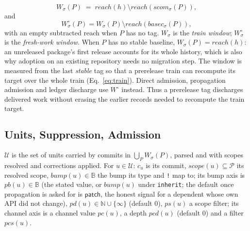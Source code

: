 \documentclass[sigconf,nonacm]{acmart}
\newcommand{\code}[1]{\texttt{#1}}
\begin{document}
\begin{definition}
\label{def:window}
\begin{equation}
  W_\sigma(P) \;=\; \mathit{reach}(h) \setminus
                    \mathit{reach}(\mathit{scom}_\sigma(P)),
  \label{eq:window}
\end{equation}
and
\begin{equation}
  W^\circ_\sigma(P) = W_\sigma(P) \setminus
                       \mathit{reach}(\mathit{basec}_\sigma(P)),
  \label{eq:fresh}
\end{equation}
with an empty subtracted reach when $P$ has no tag.  $W_\sigma$ is the
\emph{train window}; $W^\circ_\sigma$ is the \emph{fresh-work window}.
When $P$ has no stable baseline, $W_\sigma(P) = \mathit{reach}(h)$:
an unreleased package's first release accounts for its whole
history, which is also why adoption on an existing repository needs no
migration step. The window is measured from the last \emph{stable} tag
so that a prerelease train can recompute its target over the whole train
(Eq.~\ref{eq:train}). Direct admission, propagation admission and ledger
discharge use $W^\circ$ instead. Thus a prerelease tag discharges delivered
work without erasing the earlier records needed to recompute the train target.
\end{definition}

\subsection{Units, Suppression, Admission}

\begin{definition}[units]
$\mathcal{U}$ is the set of units carried by commits in
$\bigcup_P W_\sigma(P)$, parsed and with scopes resolved and corrections
applied. For $u \in \mathcal{U}$: $c_u$ is its commit,
$\mathit{scope}(u) \subseteq \mathcal{P}$ its resolved scope,
$\mathit{bump}(u) \in \mathbb{B}$ the bump its type and \code{!} map to;
its bump axis is $\mathit{pb}(u) \in \mathbb{B}$ (the stated value, or
$\mathit{bump}(u)$ under \code{inherit}; the default once propagation is
asked for is $\mathsf{patch}$, the honest signal for a dependent whose
own API did not change), $\mathit{pd}(u) \in \mathbb{N} \cup
\{\infty\}$ (default $0$), $\mathit{ps}(u)$ a scope filter; its channel
axis is a channel value $\mathit{pc}(u)$, a depth $\mathit{pcd}(u)$
(default $0$) and a filter $\mathit{pcs}(u)$.
\end{definition}
\end{document}
